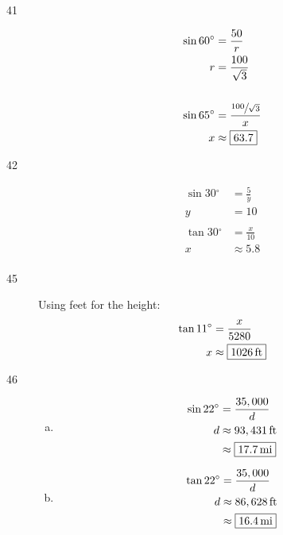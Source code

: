 \documentclass{exam}
\newcommand{\dg}{\ensuremath{^\circ}}
\begin{document}
\begin{description}
      \item[41]
        \begin{align*}
          \sin 60 \dg & = \frac{50}{r} \\
          r           & = \frac{100}{\sqrt{3}} \\
          \\
          \sin 65 \dg & = \frac{ \sfrac{100}{\sqrt{3}} }{x} \\
          x          & \approx \boxed{ 63.7 } \\
        \end{align*}

      \item[42]
        \begin{align*}
          \sin 30 \dg & = \frac{5}{y} \\
          y           & = 10 \\
          \\
          \tan 30 \dg & = \frac{x}{10} \\
          x          & \approx \boxed{ 5.8 } \\
        \end{align*}

      \item[45]
        Using feet for the height:
        \begin{align*}
          \tan 11 \dg & = \frac{x}{5280} \\
          x           & \approx \boxed{ \unit[1026]{ft} } \\
        \end{align*}

      \item[46]
        \begin{enumerate}[(a)]
          \item 
            \begin{align*}
              \sin 22 \dg & = \frac{35,000}{d} \\
              d           & \approx \unit[93,431]{ft} \\
                          & \approx \boxed{ \unit[17.7]{mi} } \\
            \end{align*}

          \item 
            \begin{align*}
              \tan 22 \dg & = \frac{35,000}{d} \\
              d           & \approx \unit[86,628]{ft} \\
                          & \approx \boxed{ \unit[16.4]{mi} } \\
            \end{align*}


\end{enumerate}
\end{description}
\end{document}
